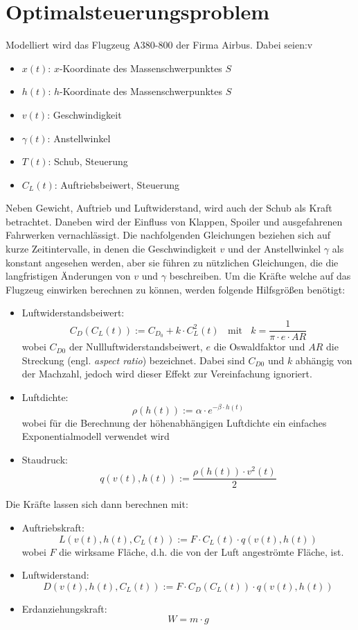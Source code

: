 \chapter{Optimalsteuerungsproblem} \label{cha:optim}

Modelliert wird das Flugzeug A380-800 der Firma Airbus. Dabei seien:v
\begin{itemize}
    \item $x(t)$: $x$-Koordinate des Massenschwerpunktes $S$
    \item $h(t)$: $h$-Koordinate des Massenschwerpunktes $S$
    \item $v(t)$: Geschwindigkeit
    \item $\gamma(t)$: Anstellwinkel
    \item $T(t)$: Schub, Steuerung
    \item $C_L(t)$: Auftriebsbeiwert, Steuerung
\end{itemize}
Neben Gewicht, Auftrieb und Luftwiderstand, wird auch der Schub als Kraft betrachtet. Daneben wird der Einfluss von Klappen, Spoiler und ausgefahrenen Fahrwerken vernachlässigt. Die nachfolgenden Gleichungen beziehen sich auf kurze Zeitintervalle, in denen die Geschwindigkeit $v$ und der Anstellwinkel $\gamma$ als konstant angesehen werden, aber sie führen zu nützlichen Gleichungen, die die langfristigen Änderungen von $v$ und $\gamma$ beschreiben. Um die Kräfte welche auf das Flugzeug einwirken berechnen zu können, werden folgende Hilfsgrößen benötigt:
\begin{itemize}
    \item Luftwiderstandsbeiwert: \[C_D(C_L(t)) := C_{D_0} + k \cdot C^2_L(t) \ \ \ \ \text{mit} \ \ \ \ k = \dfrac{1}{\pi \cdot e \cdot AR}\] wobei $C_{D0}$ der Nullluftwiderstandsbeiwert, $e$ die Oswaldfaktor und $AR$ die Streckung (engl. \textit{aspect ratio}) bezeichnet. Dabei sind $C_{D0}$ und $k$ abhängig von der Machzahl, jedoch wird dieser Effekt zur Vereinfachung ignoriert. 
    \item Luftdichte: \[\rho(h(t)) := \alpha \cdot e^{-\beta \cdot h(t)}\]  wobei für die Berechnung der höhenabhängigen Luftdichte ein einfaches Exponentialmodell verwendet wird%
    \item Staudruck: \[q(v(t), h(t)) := \dfrac{\rho(h(t)) \cdot v^2(t)}{2} \]
\end{itemize}
Die Kräfte lassen sich dann berechnen mit:
\begin{itemize}
    \item Auftriebskraft: \[L(v(t), h(t), C_L(t)) := F \cdot C_L(t) \cdot q(v(t), h(t))\] wobei $F$ die wirksame Fläche, d.h. die von der Luft angeströmte Fläche, ist.
    \item Luftwiderstand: \[D(v(t), h(t), C_L(t)) := F \cdot C_D(C_L(t)) \cdot q(v(t), h(t))\]
    \item Erdanziehungskraft: \[W = m \cdot g\]
\end{itemize}

